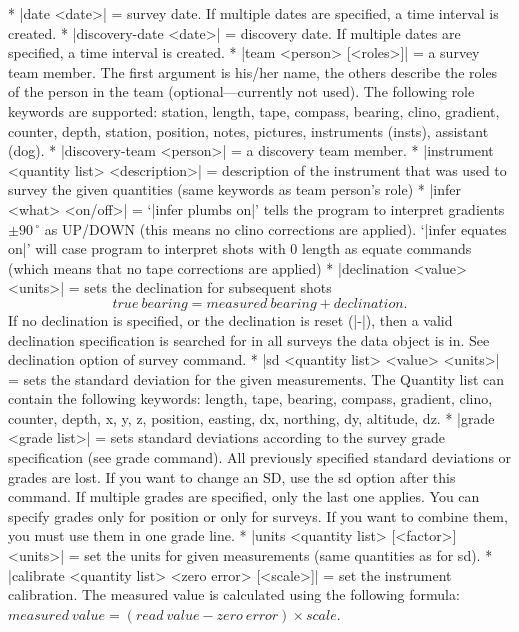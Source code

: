 \comopt
  * |date <date>| = survey date. If multiple dates are specified,
    a time interval is created.
  * |discovery-date <date>| = discovery date. If multiple dates are specified,
    a time interval is created.
  * |team <person> [<roles>]| = a survey team member. The first argument
    is his/her name, the others describe the roles of the person in
    the team (optional---currently not used). The following role keywords are
    supported: station, length, tape, compass, bearing, clino,
    gradient, counter, depth, station, position, notes, pictures, 
    instruments (insts), assistant (dog).
  * |discovery-team <person>| = a discovery team member. 
  * |instrument <quantity list> <description>| = description
    of the instrument that was used to survey the given quantities (same
    keywords as team person's role)
  * |infer <what> <on/off>| = `|infer plumbs on|' tells the
    program to interpret gradients $\pm90\,^\circ$ 
    as UP/DOWN (this means
    no clino corrections are applied). `|infer equates on|' will case program to
    interpret shots with 0 length as equate commands (which means that no
    tape corrections are applied)
  * |declination <value> <units>| = sets the declination for subsequent
    shots $$true\ bearing = measured\ bearing + declination.$$
    If no declination is specified, or the declination is reset (|-|),
    then a valid declination specification is searched for in all surveys
    the data object is in. See declination option of survey command.
  * |sd <quantity list> <value> <units>| = sets the 
    standard deviation for the given measurements. The Quantity list can 
    contain the following keywords: length, tape, bearing, compass, 
    gradient, clino, counter, depth, x, y, z, position, easting, dx,
    northing, dy, altitude, dz.
  * |grade <grade list>| = sets standard deviations according to the
    survey grade specification (see grade command). All previously
    specified standard deviations or grades are lost. If you want 
    to change an SD, use the sd option after this command. If multiple
    grades are specified, only the last one applies. You can specify
    grades only for position or only for surveys. If you want to
    combine them, you must use them in one grade line.
  * |units <quantity list> [<factor>] <units>| = set the units
    for given measurements (same quantities as for sd).
  * |calibrate <quantity list> <zero error> [<scale>]| = set the
    instrument calibration. The measured value is calculated using the
    following formula:
    $measured\ value = (read\ value - zero\ error) \times scale$.
